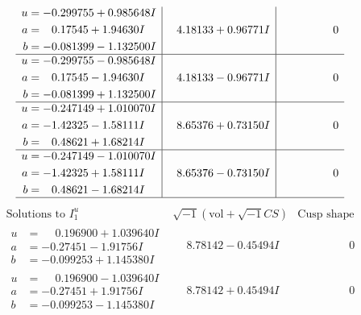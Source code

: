 \documentclass[1p]{elsarticle_modified}
\theoremstyle{definition}
\newcommand{\I}{\sqrt{-1}}
\begin{document}
$$\begin{array}{c|c|c}
\begin{aligned}
u &= -0.299755 + 0.985648 I \\
a &= \phantom{-}0.17545 + 1.94630 I \\
b &= -0.081399 - 1.132500 I\end{aligned}
 & \phantom{-}4.18133 + 0.96771 I & \phantom{-0.000000 } 0 \\ \hline\begin{aligned}
u &= -0.299755 - 0.985648 I \\
a &= \phantom{-}0.17545 - 1.94630 I \\
b &= -0.081399 + 1.132500 I\end{aligned}
 & \phantom{-}4.18133 - 0.96771 I & \phantom{-0.000000 } 0 \\ \hline\begin{aligned}
u &= -0.247149 + 1.010070 I \\
a &= -1.42325 - 1.58111 I \\
b &= \phantom{-}0.48621 + 1.68214 I\end{aligned}
 & \phantom{-}8.65376 + 0.73150 I & \phantom{-0.000000 } 0 \\ \hline\begin{aligned}
u &= -0.247149 - 1.010070 I \\
a &= -1.42325 + 1.58111 I \\
b &= \phantom{-}0.48621 - 1.68214 I\end{aligned}
 & \phantom{-}8.65376 - 0.73150 I & \phantom{-0.000000 } 0\\
 \hline 
 \end{array}$$\newpage$$\begin{array}{c|c|c}  
\text{Solutions to }I^u_{1}& \I (\text{vol} + \sqrt{-1}CS) & \text{Cusp shape}\\
 \hline 
\begin{aligned}
u &= \phantom{-}0.196900 + 1.039640 I \\
a &= -0.27451 - 1.91756 I \\
b &= -0.099253 + 1.145380 I\end{aligned}
 & \phantom{-}8.78142 - 0.45494 I & \phantom{-0.000000 } 0 \\ \hline\begin{aligned}
u &= \phantom{-}0.196900 - 1.039640 I \\
a &= -0.27451 + 1.91756 I \\
b &= -0.099253 - 1.145380 I\end{aligned}
 & \phantom{-}8.78142 + 0.45494 I & \phantom{-0.000000 } 0 \\ \hline\begin{aligned}

\end{aligned}
\end{array}$$
\end{document}
